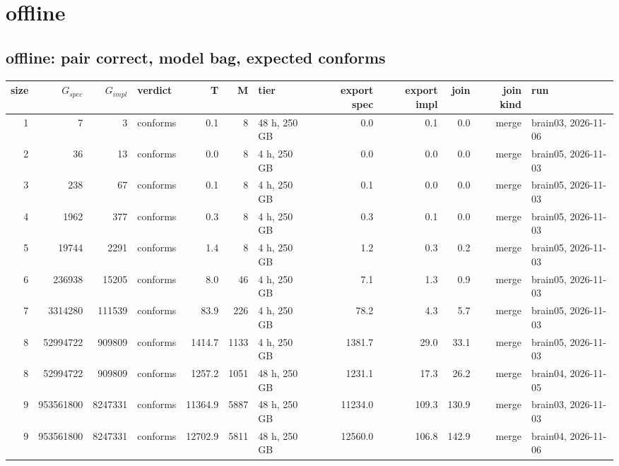 \documentclass[10pt]{article}
\begin{document}
\section*{offline}
\subsection*{offline: pair \textsf{correct}, model bag, expected conforms}
\begin{longtable}{@{}rrrlrrlrrrrl@{}}
\toprule
size & $G_{\mathit{spec}}$ & $G_{\mathit{impl}}$ & verdict & T & M & tier & export spec & export impl & join & join kind & run \\
\midrule
\endhead
\color{blue} 1 & 7 & 3 & conforms & 0.1 & 8 & 48 h, 250 GB & 0.0 & 0.1 & 0.0 & merge & brain03, 2026-11-06 \\
\color{blue} 2 & 36 & 13 & conforms & 0.0 & 8 & 4 h, 250 GB & 0.0 & 0.0 & 0.0 & merge & brain05, 2026-11-03 \\
\color{blue} 3 & 238 & 67 & conforms & 0.1 & 8 & 4 h, 250 GB & 0.1 & 0.0 & 0.0 & merge & brain05, 2026-11-03 \\
\color{blue} 4 & 1962 & 377 & conforms & 0.3 & 8 & 4 h, 250 GB & 0.3 & 0.1 & 0.0 & merge & brain05, 2026-11-03 \\
\color{blue} 5 & 19744 & 2291 & conforms & 1.4 & 8 & 4 h, 250 GB & 1.2 & 0.3 & 0.2 & merge & brain05, 2026-11-03 \\
\color{blue} 6 & 236938 & 15205 & conforms & 8.0 & 46 & 4 h, 250 GB & 7.1 & 1.3 & 0.9 & merge & brain05, 2026-11-03 \\
\color{blue} 7 & 3314280 & 111539 & conforms & 83.9 & 226 & 4 h, 250 GB & 78.2 & 4.3 & 5.7 & merge & brain05, 2026-11-03 \\
\color{blue} 8 & 52994722 & 909809 & conforms & 1414.7 & 1133 & 4 h, 250 GB & 1381.7 & 29.0 & 33.1 & merge & brain05, 2026-11-03 \\
\color{blue} 8 & 52994722 & 909809 & conforms & 1257.2 & 1051 & 48 h, 250 GB & 1231.1 & 17.3 & 26.2 & merge & brain04, 2026-11-05 \\
\color{blue} 9 & 953561800 & 8247331 & conforms & 11364.9 & 5887 & 48 h, 250 GB & 11234.0 & 109.3 & 130.9 & merge & brain03, 2026-11-03 \\
\color{blue} 9 & 953561800 & 8247331 & conforms & 12702.9 & 5811 & 48 h, 250 GB & 12560.0 & 106.8 & 142.9 & merge & brain04, 2026-11-06 \\
\bottomrule
\end{longtable}
\end{document}
